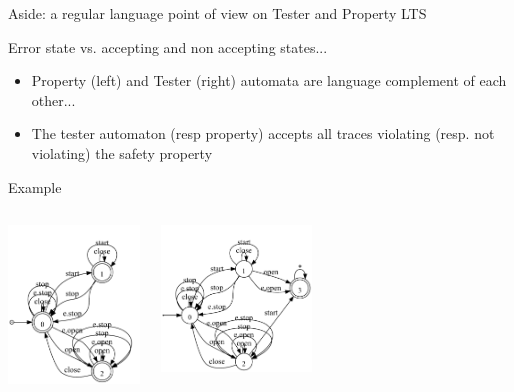 \documentclass[11pt]{beamer}
\begin{document}
\begin{frame}{Aside: a regular language point of view on Tester and Property LTS}
	\begin{block}{Error state vs. accepting and non accepting states...}
		\begin{itemize}
			\item Property (left) and Tester (right) automata are language complement of each other...
			\item The tester automaton (resp property) accepts all traces violating (resp. not violating) the safety property
		\end{itemize}
	\end{block}
	\begin{block}{Example}
		\vspace{-0.5cm}
		\begin{columns}
				\begin{center} 
					\includegraphics[width=3.5cm, trim=0mm 0mm 0mm 10mm, clip]{images/MaintainDoorsClosedWhileMoving_property.pdf}
				\end{center}
				\begin{center} 
					\includegraphics[width=4cm, trim=0mm 0mm 0mm 10mm, clip]{images/MaintainDoorsClosedWhileMoving_tester.pdf}
				\end{center}
		\end{columns}
	\end{block}
\end{frame}
\end{document}
